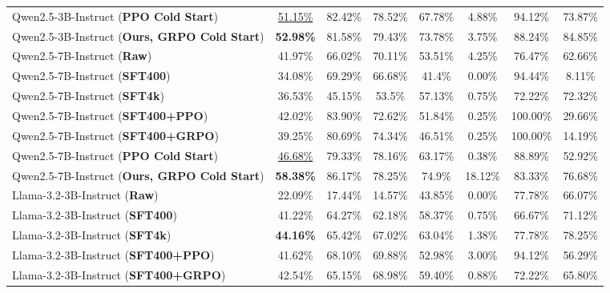 \begin{table}[!t]
{\begin{tabular}{lccccccc}
Qwen2.5-3B-Instruct (\textbf{PPO Cold Start}) & \uline{51.15\%} & 82.42\% & 78.52\% & 67.78\% & 4.88\% & 94.12\% & 73.87\% \\
Qwen2.5-3B-Instruct (\textbf{Ours, GRPO Cold Start}) & \textbf{52.98\%} & 81.58\% & 79.43\% & 73.78\% & 3.75\% & 88.24\% & 84.85\% \\
\midrule
Qwen2.5-7B-Instruct (\textbf{Raw}) & 41.97\% & 66.02\% & 70.11\% & 53.51\% & 4.25\% & 76.47\% & 62.66\% \\
Qwen2.5-7B-Instruct (\textbf{SFT400}) & 34.08\% & 69.29\% & 66.68\% & 41.4\% & 0.00\% & 94.44\% & 8.11\% \\
Qwen2.5-7B-Instruct (\textbf{SFT4k}) & 36.53\% & 45.15\% & 53.5\% & 57.13\% & 0.75\% & 72.22\% & 72.32\% \\
Qwen2.5-7B-Instruct (\textbf{SFT400+PPO}) & 42.02\% & 83.90\% & 72.62\% & 51.84\% & 0.25\% & 100.00\% & 29.66\% \\
Qwen2.5-7B-Instruct (\textbf{SFT400+GRPO}) & 39.25\% & 80.69\% & 74.34\% & 46.51\% & 0.25\% & 100.00\% & 14.19\% \\
Qwen2.5-7B-Instruct (\textbf{PPO Cold Start}) & \uline{46.68\%} & 79.33\% & 78.16\% & 63.17\% & 0.38\% & 88.89\% & 52.92\% \\
Qwen2.5-7B-Instruct (\textbf{Ours, GRPO Cold Start}) & \textbf{58.38\%} & 86.17\% & 78.25\% & 74.9\% & 18.12\% & 83.33\% & 76.68\%  \\
\midrule
Llama-3.2-3B-Instruct (\textbf{Raw}) & 22.09\% & 17.44\% & 14.57\% & 43.85\% & 0.00\% & 77.78\% & 66.07\% \\
Llama-3.2-3B-Instruct (\textbf{SFT400}) & 41.22\% & 64.27\% & 62.18\% & 58.37\% & 0.75\% & 66.67\% & 71.12\% \\
Llama-3.2-3B-Instruct (\textbf{SFT4k}) & \textbf{44.16\%} & 65.42\% & 67.02\% & 63.04\% & 1.38\% & 77.78\% & 78.25\% \\
Llama-3.2-3B-Instruct (\textbf{SFT400+PPO}) & 41.62\% & 68.10\% & 69.88\% & 52.98\% & 3.00\% & 94.12\% & 56.29\% \\
Llama-3.2-3B-Instruct (\textbf{SFT400+GRPO}) & 42.54\% & 65.15\% & 68.98\% & 59.40\% & 0.88\% & 72.22\% & 65.80\% \\

\end{tabular}}
\end{table}
